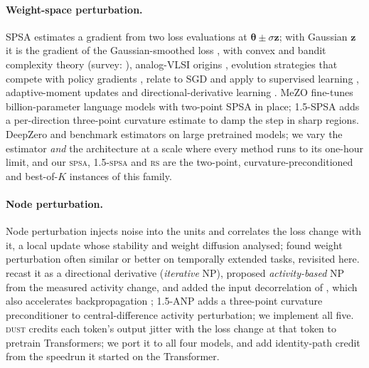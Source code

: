 \documentclass{article}
\newcommand{\method}[1]{\textsc{#1}}
\newcommand{\SPSA}{\method{spsa}}
\newcommand{\SPSAb}{\method{1.5-spsa}}
\newcommand{\RS}{\method{rs}}
\newcommand{\DUST}{\method{dust}}
\newcommand{\btheta}{\boldsymbol{\theta}}
\newcommand{\bz}{\mathbf{z}}
\begin{document}
\paragraph{Weight-space perturbation.}
SPSA \citep{spall1992,spall1998} estimates a gradient from two loss evaluations at
$\btheta\pm\sigma\bz$; with Gaussian $\bz$ it is the gradient of the Gaussian-smoothed
loss \citep{nesterov2017}, with convex \citep{duchi2015} and bandit \citep{flaxman2005}
complexity theory (survey: \citealp{liu2020primer}), analog-VLSI origins
\citep{jabri1992weight,cauwenberghs1993fast,flower1993summed}, evolution strategies
\citep{wierstra2014,hansen2003,hansen2016} that compete with policy gradients
\citep{salimans2017,mania2018}, relate to SGD \citep{zhang2017relationship} and apply
to supervised learning \citep{lenc2019non}, adaptive-moment updates
\citep{chen2019zoadamm} and directional-derivative learning \citep{silver2021learning}.
MeZO \citep{malladi2023} fine-tunes billion-parameter language models with two-point
SPSA in place; 1.5-SPSA \citep{chaubard2025spsa15} adds a per-direction three-point
curvature estimate to damp the step in sharp regions. DeepZero
\citep{chen2024deepzero} and \citet{zhang2024revisiting} benchmark estimators on
large pretrained models; we vary the estimator \emph{and} the architecture at a scale where every
method runs to its one-hour limit, and our \SPSA{}, \SPSAb{} and \RS{} are the
two-point, curvature-preconditioned and best-of-$K$ instances of this family.

\paragraph{Node perturbation.}
Node perturbation injects noise into the units and correlates the loss change with
it, a local update \citep{widrow1990,werfel2003,werfel2005,fiete2006} whose stability
and weight diffusion \citet{hiratani2022} analysed; \citet{zuge2023weight} found
weight perturbation often similar or better on temporally extended tasks, revisited
here. \citet{dalm2023} recast it as a directional derivative (\emph{iterative} NP),
proposed \emph{activity-based} NP from the measured activity change, and added the
input decorrelation of \citet{ahmad2023constrained}, which also accelerates
backpropagation \citep{dalm2024,ahmad2024}; 1.5-ANP \citep{chaubard2025anp15} adds a
three-point curvature preconditioner to central-difference activity perturbation; we
implement all five. \DUST{} \citep{dahal2026dust} credits each token's output jitter with the
loss change at that token to pretrain Transformers; we port it to all four models, and
add identity-path credit from the speedrun it started \citep{noise2026} on the Transformer.
\end{document}
